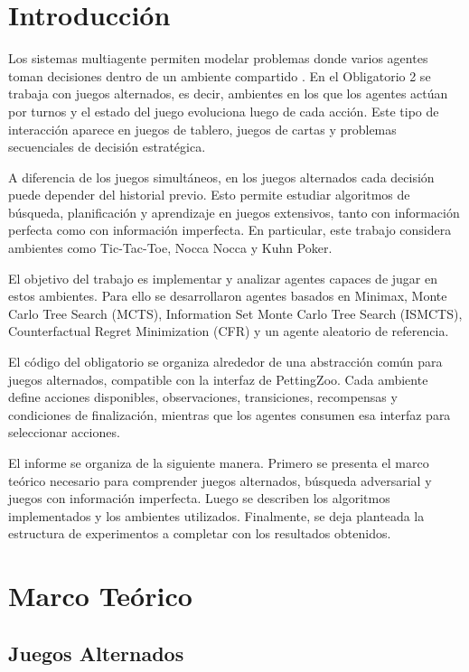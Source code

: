 \documentclass[letterpaper,12pt]{article}
\begin{document}
    
    \newpage
    \tableofcontents
    \newpage

\section{Introducción}

Los sistemas multiagente permiten modelar problemas donde varios agentes toman decisiones dentro de un ambiente compartido \citep{shoham2008,russell2021}. En el Obligatorio 2 se trabaja con juegos alternados, es decir, ambientes en los que los agentes actúan por turnos y el estado del juego evoluciona luego de cada acción. Este tipo de interacción aparece en juegos de tablero, juegos de cartas y problemas secuenciales de decisión estratégica.

A diferencia de los juegos simultáneos, en los juegos alternados cada decisión puede depender del historial previo. Esto permite estudiar algoritmos de búsqueda, planificación y aprendizaje en juegos extensivos, tanto con información perfecta como con información imperfecta. En particular, este trabajo considera ambientes como Tic-Tac-Toe, Nocca Nocca y Kuhn Poker.

El objetivo del trabajo es implementar y analizar agentes capaces de jugar en estos ambientes. Para ello se desarrollaron agentes basados en Minimax, Monte Carlo Tree Search (MCTS), Information Set Monte Carlo Tree Search (ISMCTS), Counterfactual Regret Minimization (CFR) y un agente aleatorio de referencia.

El código del obligatorio se organiza alrededor de una abstracción común para juegos alternados, compatible con la interfaz de PettingZoo. Cada ambiente define acciones disponibles, observaciones, transiciones, recompensas y condiciones de finalización, mientras que los agentes consumen esa interfaz para seleccionar acciones.

El informe se organiza de la siguiente manera. Primero se presenta el marco teórico necesario para comprender juegos alternados, búsqueda adversarial y juegos con información imperfecta. Luego se describen los algoritmos implementados y los ambientes utilizados. Finalmente, se deja planteada la estructura de experimentos a completar con los resultados obtenidos.

\clearpage
\section{Marco Teórico}

\subsection{Juegos Alternados}
\end{document}
